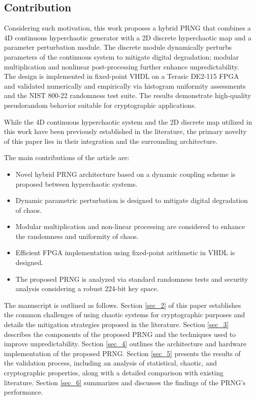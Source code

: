 \documentclass[preprint, 12pt, sort&compress]{elsarticle}
\begin{document}
{\color{red}
\subsection{Contribution}
Considering such motivation, this work proposes a hybrid PRNG that combines a 4D continuous hyperchaotic generator with a 2D discrete hyperchaotic map and a parameter perturbation module. The discrete module dynamically perturbs parameters of the continuous system to mitigate digital degradation; modular multiplication and nonlinear post-processing further enhance unpredictability. The design is implemented in fixed-point VHDL on a Terasic DE2-115 FPGA and validated numerically and empirically via histogram uniformity assessments and the NIST 800-22 randomness test suite. The results demonstrate high-quality pseudorandom behavior suitable for cryptographic applications.

While the 4D continuous hyperchaotic system and the 2D discrete map utilized in this work have been previously established in the literature, the primary novelty of this paper lies in their integration and the surrounding architecture.

The main contributions of the article are:
\begin{itemize}[leftmargin=2.5em, itemsep=0.1em, label=\textbullet]
  \item Novel hybrid PRNG architecture based on a dynamic coupling scheme is proposed between hyperchaotic systems.
  \item Dynamic parametric perturbation is designed to mitigate digital degradation of chaos.
  \item Modular multiplication and non-linear processing are considered to enhance the randomness and uniformity of chaos.
  \item Efficient FPGA implementation using fixed-point arithmetic in VHDL is designed.
  \item The proposed PRNG is analyzed via standard randomness tests and security analysis considering a robust 224-bit key space.
\end{itemize}
}

The manuscript is outlined as follows. Section \ref{sec_2} of this paper establishes the common challenges of using chaotic systems for cryptographic purposes and details the mitigation strategies proposed in the literature. Section \ref{sec_3} describes the components of the proposed PRNG and the techniques used to improve unpredictability. Section \ref{sec_4} outlines the architecture and hardware implementation of the proposed PRNG. Section \ref{sec_5} presents the results of the validation process, including an analysis of statistical, chaotic, and cryptographic properties, along with a detailed comparison with existing literature. Section \ref{sec_6} summarizes and discusses the findings of the PRNG's performance.
\end{document}
